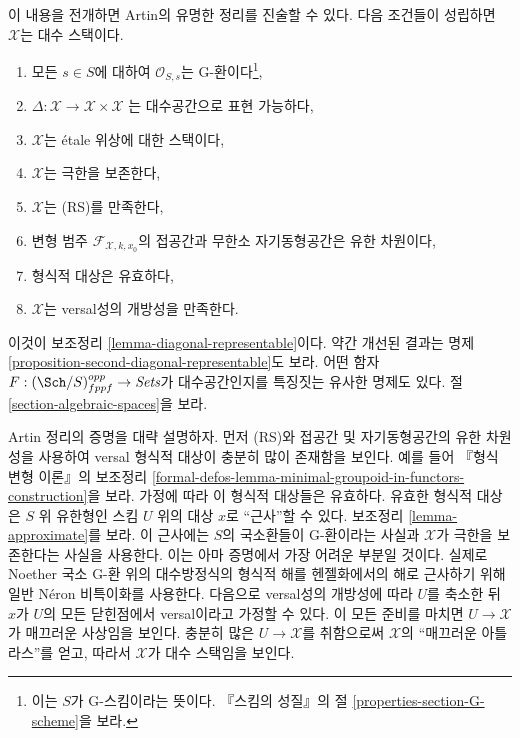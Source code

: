 \medskip\noindent
이 내용을 전개하면 Artin의 유명한 정리를 진술할 수 있다. 다음 조건들이
성립하면 $\mathcal{X}$는 대수 스택이다.
\begin{enumerate}
\item 모든 $s \in S$에 대하여 $\mathcal{O}_{S, s}$는 G-환이다\footnote{이는
$S$가 G-스킴이라는 뜻이다. 『스킴의 성질』의 절
\ref{properties-section-G-scheme}을 보라.},
\item $\Delta : \mathcal{X} \to \mathcal{X} \times \mathcal{X}$
는 대수공간으로 표현 가능하다,
\item $\mathcal{X}$는 \'etale 위상에 대한 스택이다,
\item $\mathcal{X}$는 극한을 보존한다,
\item $\mathcal{X}$는 (RS)를 만족한다,
\item 변형 범주 $\mathcal{F}_{\mathcal{X}, k, x_0}$의 접공간과
무한소 자기동형공간은 유한 차원이다,
\item 형식적 대상은 유효하다,
\item $\mathcal{X}$는 versal성의 개방성을 만족한다.
\end{enumerate}
이것이 보조정리 \ref{lemma-diagonal-representable}이다. 약간 개선된
결과는 명제 \ref{proposition-second-diagonal-representable}도 보라.
어떤 함자 $F : (\Sch/S)_{fppf}^{opp} \to \textit{Sets}$가
대수공간인지를 특징짓는 유사한 명제도 있다. 절
\ref{section-algebraic-spaces}을 보라.

\medskip\noindent
Artin 정리의 증명을 대략 설명하자. 먼저 (RS)와 접공간 및
자기동형공간의 유한 차원성을 사용하여 versal 형식적 대상이 충분히
많이 존재함을 보인다. 예를 들어 『형식 변형 이론』의 보조정리
\ref{formal-defos-lemma-minimal-groupoid-in-functors-construction}을 보라.
가정에 따라 이 형식적 대상들은 유효하다. 유효한 형식적 대상은
$S$ 위 유한형인 스킴 $U$ 위의 대상 $x$로 ``근사''할 수 있다.
보조정리 \ref{lemma-approximate}를 보라.
이 근사에는 $S$의 국소환들이 G-환이라는 사실과 $\mathcal{X}$가
극한을 보존한다는 사실을 사용한다. 이는 아마 증명에서 가장 어려운
부분일 것이다. 실제로 Noether 국소 G-환 위의 대수방정식의 형식적 해를
헨젤화에서의 해로 근사하기 위해 일반 N\'eron 비특이화를 사용한다.
다음으로 versal성의 개방성에 따라 $U$를 축소한 뒤 $x$가 $U$의 모든
닫힌점에서 versal이라고 가정할 수 있다. 이 모든 준비를 마치면
$U \to \mathcal{X}$가 매끄러운 사상임을 보인다. 충분히 많은
$U \to \mathcal{X}$를 취함으로써 $\mathcal{X}$의 ``매끄러운 아틀라스''를
얻고, 따라서 $\mathcal{X}$가 대수 스택임을 보인다.

